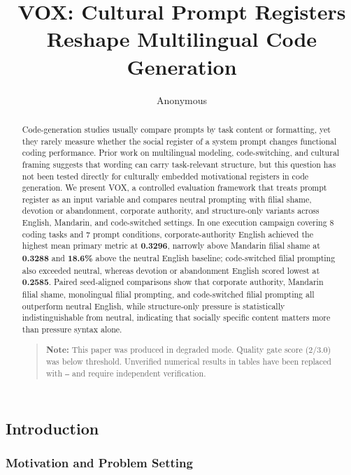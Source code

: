 \documentclass{article}
\title{VOX: Cultural Prompt Registers Reshape Multilingual Code Generation}
\author{Anonymous}
\begin{document}
\begin{abstract}
Code-generation studies usually compare prompts by task content or formatting, yet they rarely measure whether the social register of a system prompt changes functional coding performance. Prior work on multilingual modeling, code-switching, and cultural framing suggests that wording can carry task-relevant structure, but this question has not been tested directly for culturally embedded motivational registers in code generation. We present VOX, a controlled evaluation framework that treats prompt register as an input variable and compares neutral prompting with filial shame, devotion or abandonment, corporate authority, and structure-only variants across English, Mandarin, and code-switched settings. In one execution campaign covering 8 coding tasks and 7 prompt conditions, corporate-authority English achieved the highest mean primary metric at \textbf{0.3296}, narrowly above Mandarin filial shame at \textbf{0.3288} and \textbf{18.6\%} above the neutral English baseline; code-switched filial prompting also exceeded neutral, whereas devotion or abandonment English scored lowest at \textbf{0.2585}. Paired seed-aligned comparisons show that corporate authority, Mandarin filial shame, monolingual filial prompting, and code-switched filial prompting all outperform neutral English, while structure-only pressure is statistically indistinguishable from neutral, indicating that socially specific content matters more than pressure syntax alone.

\begin{quote}
\textbf{Note:} This paper was produced in degraded mode. Quality gate score (2/3.0) was below threshold. Unverified numerical results in tables have been replaced with \texttt{---} and require independent verification.
\end{quote}
\end{abstract}

\maketitle

\subsection{Introduction}

\label{sec:introduction}

\subsubsection{Motivation and Problem Setting}
\end{document}
